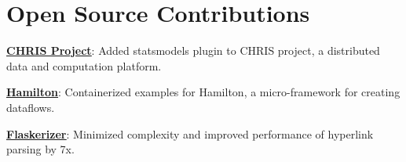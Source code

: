 \section{Open Source Contributions}
    \resumeSubHeadingListStart

     \resumeProjectHeading
    {\href{https://github.com/rh-impact/pl-statsmodels/pull/2}{\underline{\textbf{CHRIS Project}}}: Added statsmodels plugin to CHRIS project, a distributed data and computation platform.}{}
    {}{}

     \resumeProjectHeading
    {\href{https://github.com/stitchfix/hamilton/pull/209}{\underline{\textbf{Hamilton}}}: Containerized examples for Hamilton, a micro-framework for creating dataflows.}{}
    {}{}

      \resumeProjectHeading
    {\href{https://github.com/brettvanderwerff/Flaskerizer/pull/73}{\underline{\textbf{Flaskerizer}}}: Minimized complexity and improved performance of hyperlink parsing by 7x.}{}
    {}{}

    \resumeSubHeadingListEnd